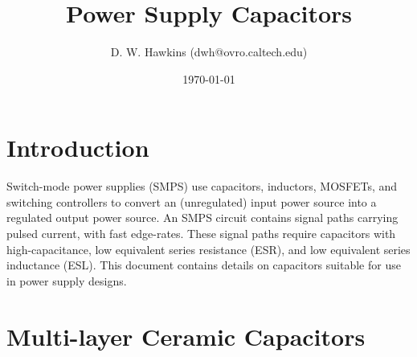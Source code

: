 \documentclass[10pt,twoside]{article}
\begin{document}
\title{Power Supply Capacitors}
\author{D. W. Hawkins (dwh@ovro.caltech.edu)}
\date{\today}
\maketitle

\thispagestyle{empty}

\tableofcontents

\cleardoublepage

\pagestyle{fancy}
\chead{}
\rhead{\today}
\lfoot{}
\cfoot{}
\rfoot{\thepage}
\renewcommand{\headrulewidth}{0.4pt}
\renewcommand{\footrulewidth}{0.4pt}

\lstset{language=Tcl}

\section{Introduction}

Switch-mode power supplies (SMPS) use capacitors, inductors, 
MOSFETs, and switching controllers to convert an (unregulated)
input power source into a regulated output power source.
An SMPS circuit contains signal paths carrying pulsed
current, with fast edge-rates. These signal paths require
capacitors with high-capacitance, low equivalent series 
resistance (ESR), and low equivalent series inductance (ESL).
This document contains details on capacitors suitable for
use in power supply designs.

\section{Multi-layer Ceramic Capacitors}
\end{document}
